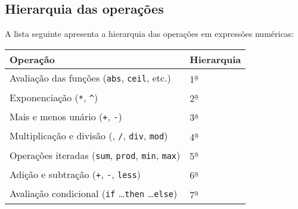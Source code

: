\documentclass[11pt, brazil]{report}
\begin{document}
\subsection{Hierarquia das operações}
\label{hierarchy}

A lista seguinte apresenta a hierarquia das operações
em expressões numéricas:


\noindent\hfil
\begin{tabular}{@{}ll@{}}
Operação&Hierarquia\\
\hline
Avaliação das funções ({\tt abs}, {\tt ceil}, etc.)&
1{\textsuperscript{\b{a}}}\\
Exponenciação ({\tt**}, {\tt\textasciicircum})&
2{\textsuperscript{\b{a}}}\\
Mais e menos unário ({\tt+}, {\tt-})&
3{\textsuperscript{\b{a}}}\\
Multiplicação e divisão ({\tt*}, {\tt/}, {\tt div}, {\tt mod})&
4{\textsuperscript{\b{a}}}\\
Operações iteradas ({\tt sum}, {\tt prod}, {\tt min}, {\tt max})&
5{\textsuperscript{\b{a}}}\\
Adição e subtração ({\tt+}, {\tt-}, {\tt less})&
6{\textsuperscript{\b{a}}}\\
Avaliação condicional ({\tt if} \dots {\tt then} \dots {\tt else})&
7{\textsuperscript{\b{a}}}\\
\end{tabular}

\end{document}
